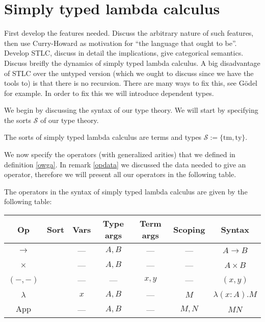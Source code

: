 \newcommand{\tm}{\mathrm{tm}}
\newcommand{\ty}{\mathrm{ty}}
\newcommand{\fst}{\mathrm{fst}}
\newcommand{\snd}{\mathrm{snd}}

%
%
\section{Simply typed lambda calculus} 


First develop the features needed. Discuss the arbitrary nature of such features, then use Curry-Howard as motivation for ``the language that ought to be''. Develop STLC, discuss in detail the implications, give categorical semantics. Discuss breifly the dynamics of simply typed lambda calculus. A big disadvantage of STLC over the untyped version (which we ought to discuss since we have the tools to) is that there is no recursion. There are many ways to fix this, see G\"odel for example. In order to fix this we will introduce dependent types.

We begin by discussing the syntax of our type theory. We will start by specifying the sorts $\mathcal{S}$ of our type theory.

\begin{defin}
    The sorts of simply typed lambda calculus are terms and types $\mathcal{S} := \{ \tm , \ty\}$.
\end{defin}

We now specify the operators (with generalized arities) that we defined in definition \ref{owga}. In remark \ref{opdata} we discussed the data needed to give an operator, therefore we will present all our operators in the following table.

\begin{defin}
    The operators in the syntax of simply typed lambda calculus are given by the following table:
    \begin{center}
        \begin{tabular}{ c|c|c|c|c|c|c }
        Op & Sort & Vars & Type args & Term args & Scoping & Syntax \\
        \hline
        $\to$           & \ty &  --- & $A,B$ &  ---  &  ---  & $A \to B$            \\
        $\times$        & \ty &  --- & $A,B$ &  ---  &  ---  & $A \times B$         \\
        $(-,-)$         & \tm &  --- &  ---  & $x,y$ &  ---  & $(x,y)$              \\
        $\lambda$       & \tm &  $x$ & $A,B$ &  ---  &  $M$  & $\lambda (x : A).M$  \\
        $\mathrm{App}$  & \tm &  --- & $A,B$ &  ---  & $M,N$ & $M N$
        \end{tabular}
    \end{center}
\end{defin}


